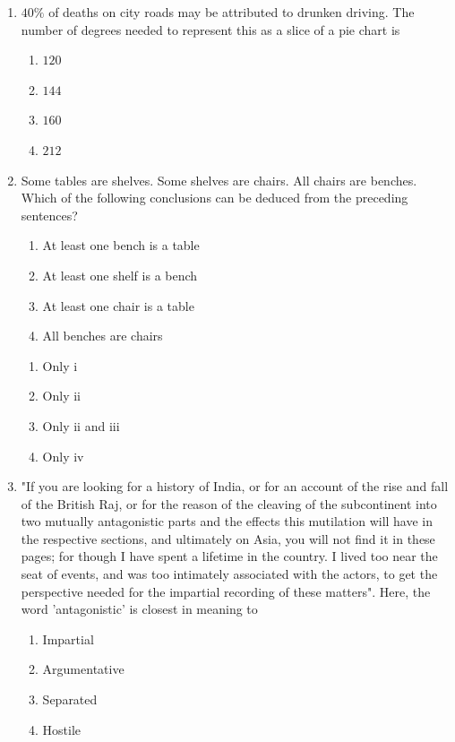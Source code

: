 \documentclass[journal,12pt,onecolumn]{IEEEtran}
\theoremstyle{remark}
\begin{document}
\begin{enumerate}
\item $40\%$ of deaths on city roads may be attributed to drunken driving. The number of degrees needed to represent this as a slice of a pie chart is
\begin{multicols}{4}
\begin{enumerate}
\item $120$
\item $144$
\item $160$
\item $212$
\end{enumerate}
\end{multicols}
\hfill {}

\item Some tables are shelves. Some shelves are chairs. All chairs are benches. Which of the following conclusions can be deduced from the preceding sentences?
\begin{enumerate}[label=\roman*.]
\item At least one bench is a table
\item At least one shelf is a bench
\item At least one chair is a table
\item All benches are chairs
\end{enumerate}
\begin{enumerate}
    \item Only i
    \item Only ii
    \item Only ii and iii
    \item Only iv
\end{enumerate}
\hfill {}

\item "If you are looking for a history of India, or for an account of the rise and fall of the British Raj, or for the reason of the cleaving of the subcontinent into two mutually antagonistic parts and the effects this mutilation will have in the respective sections, and ultimately on Asia, you will not find it in these pages; for though I have spent a lifetime in the country. I lived too near the seat of events, and was too intimately associated with the actors, to get the perspective needed for the impartial recording of these matters". 
Here, the word 'antagonistic' is closest in meaning to 
\begin{multicols}{4}
\begin{enumerate}
\item Impartial
\item Argumentative
\item Separated
\item Hostile
\end{enumerate}
\end{multicols}
\hfill {}


\end{enumerate}
\end{document}
